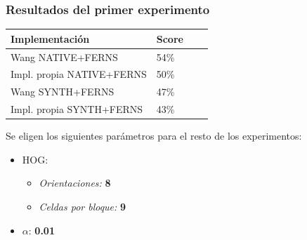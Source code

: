		\begin{frame}
				\frametitle{Resultados del primer experimento}
				\begin{table}
				\centering
	    				\begin{tabular}{ | l | l | l | p{5cm} |}
    						\hline
    						\textbf{Implementación} & \textbf{Score} \\ \hline
    						Wang NATIVE+FERNS & 54\% \\ \hline
    						Impl. propia NATIVE+FERNS & 50\% \\ \hline
    						Wang SYNTH+FERNS & 47\% \\ \hline
    						Impl. propia SYNTH+FERNS & 43\% \\
   						\hline
    					\end{tabular}
				\end{table}
				\pause
				Se eligen los siguientes parámetros para el resto de los experimentos:
				\begin{itemize}
					\item<1-> HOG:
						\begin{itemize}
							\item<2-> \textit{Orientaciones:} \textbf{8}
							\item<3-> \textit{Celdas por bloque:} \textbf{9}
						\end{itemize}
					\item<4-> $\alpha$: \textbf{0.01}						 				
				\end{itemize}
		\end{frame}
